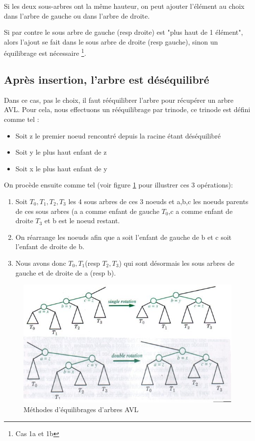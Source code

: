 \documentclass[10pt,a4paper]{article}
\begin{document}
Si les deux sous-arbres ont la même hauteur, on peut ajouter l'élément au choix dans l'arbre de gauche ou dans l'arbre de droite.

Si par contre le sous arbre de gauche (resp droite) est "plus haut de 1 élément", alors l'ajout se fait dans le sous arbre de droite (resp gauche), sinon un équilibrage est nécessaire \footnote{Cas 1a et 1b}.
\subsection*{Après insertion, l'arbre est déséquilibré}
Dans ce cas, pas le choix, il faut rééquilibrer l'arbre pour récupérer un arbre AVL. Pour cela, nous effectuons un rééquilibrage par trinode, ce trinode est défini comme tel :
\begin{itemize}
\item Soit z le premier noeud rencontré depuis la racine étant déséquilibré
\item Soit y le plus haut enfant de z
\item Soit x le plus haut enfant de y
\end{itemize}
On procède ensuite comme tel (voir figure \ref{avleq} pour illustrer ces 3 opérations):
\begin{enumerate}

\item Soit $T_0,T_1,T_2,T_3$ les 4 sous arbres de ces 3 noeuds et a,b,c les noeuds parents de ces sous arbres (a a comme enfant de gauche $T_0$,c a comme enfant de droite $T_3$ et b est le noeud restant.
\item On réarrange les noeuds afin que a soit l'enfant de gauche de b et c soit l'enfant de droite de b.
\item Nous avons donc $T_0,T_1$(resp $T_2,T_3$) qui sont désormais les sous arbres de gauche et de droite de a (resp b).
\end{enumerate}
\begin{figure}[!h]
\centering
\includegraphics[scale=0.7]{equilibrage.jpg}
\caption{Méthodes d'équilibrages d'arbres AVL}
\label{avleq}
\end{figure}
\end{document}
